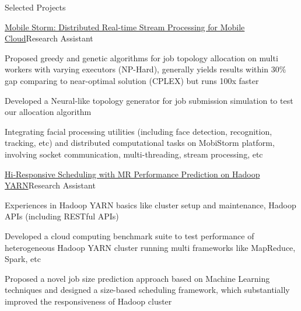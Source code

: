 \documentclass{resume} %
\begin{document}
\begin{rSection}{Selected Projects}
\begin{rSubsection}{\href{http://ieeexplore.ieee.org/document/7335296/?arnumber=7335296}{Mobile Storm: Distributed Real-time Stream Processing for Mobile Cloud}}{Research Assistant}{}{}
\item Proposed greedy and genetic algorithms for job topology allocation on multi workers with varying executors (NP-Hard), generally yields results within $30\%$ gap comparing to near-optimal solution (CPLEX) but runs 100x faster
\item Developed a Neural-like topology generator for job submission simulation to test our allocation algorithm
\item Integrating facial processing utilities (including face detection, recognition, tracking, etc) and distributed computational tasks on MobiStorm platform, involving socket communication, multi-threading, stream processing, etc

\end{rSubsection}

\begin{rSubsection}{\href{http://ieeexplore.ieee.org/document/7579961/}{Hi-Responsive Scheduling with MR Performance Prediction on Hadoop YARN}}{Research Assistant}{}{}
\item Experiences in Hadoop YARN basics like cluster setup and maintenance, Hadoop APIs (including RESTful APIs)
\item Developed a cloud computing benchmark suite to test performance of heterogeneous Hadoop YARN cluster running multi frameworks like MapReduce, Spark, etc
\item Proposed a novel job size prediction approach based on Machine Learning techniques and designed a size-based scheduling framework, which substantially improved the responsiveness of Hadoop cluster

\end{rSubsection}





\end{rSection}
\end{document}
